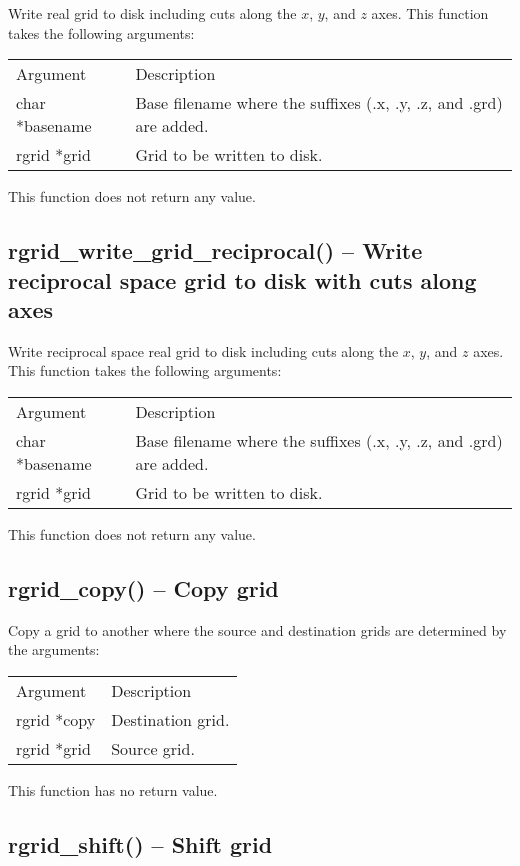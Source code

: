 \documentclass[12pt,letterpaper]{report}
\begin{document}
Write real grid to disk including cuts along the $x$, $y$, and $z$ axes. This function takes the following arguments:
\begin{longtable}{p{} p{}}
Argument & Description\\
\cline{1-2}
char *basename & Base filename where the suffixes (.x, .y, .z, and .grd) are added.\\
rgrid *grid & Grid to be written to disk.\\
\end{longtable}
\noindent
This function does not return any value.

\subsection{rgrid\_write\_grid\_reciprocal() -- Write reciprocal space grid to disk with cuts along axes}

Write reciprocal space real grid to disk including cuts along the $x$, $y$, and $z$ axes. This function takes the following arguments:
\begin{longtable}{p{} p{}}
Argument & Description\\
\cline{1-2}
char *basename & Base filename where the suffixes (.x, .y, .z, and .grd) are added.\\
rgrid *grid & Grid to be written to disk.\\
\end{longtable}
\noindent
This function does not return any value.

\subsection{rgrid\_copy() -- Copy grid}

Copy a grid to another where the source and destination grids are determined by the arguments:
\begin{longtable}{p{} p{}}
Argument & Description\\
\cline{1-2}
rgrid *copy & Destination grid.\\
rgrid *grid & Source grid.\\
\end{longtable}
\noindent
This function has no return value.

\subsection{rgrid\_shift() -- Shift grid}
\end{document}
